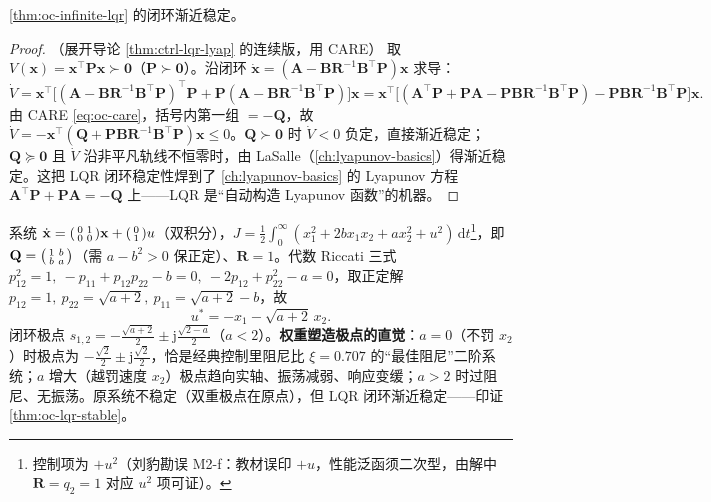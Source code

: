 \begin{theorem}\label{thm:oc-lqr-stable}
\cref{thm:oc-infinite-lqr} 的闭环渐近稳定。
\end{theorem}
\begin{proof}（展开导论 \cref{thm:ctrl-lqr-lyap} 的连续版，用 CARE）
取 $V(\mathbf x)=\mathbf x^\top\mathbf P\mathbf x\succ\mathbf0$（$\mathbf P\succ\mathbf0$）。沿闭环 $\dot{\mathbf x}=(\mathbf A-\mathbf B\mathbf R^{-1}\mathbf B^\top\mathbf P)\mathbf x$ 求导：
\[
  \dot V=\mathbf x^\top\big[(\mathbf A-\mathbf B\mathbf R^{-1}\mathbf B^\top\mathbf P)^\top\mathbf P+\mathbf P(\mathbf A-\mathbf B\mathbf R^{-1}\mathbf B^\top\mathbf P)\big]\mathbf x
  =\mathbf x^\top\big[(\mathbf A^\top\mathbf P+\mathbf P\mathbf A-\mathbf P\mathbf B\mathbf R^{-1}\mathbf B^\top\mathbf P)-\mathbf P\mathbf B\mathbf R^{-1}\mathbf B^\top\mathbf P\big]\mathbf x.
\]
由 CARE \cref{eq:oc-care}，括号内第一组 $=-\mathbf Q$，故 $\dot V=-\mathbf x^\top(\mathbf Q+\mathbf P\mathbf B\mathbf R^{-1}\mathbf B^\top\mathbf P)\mathbf x\le0$。$\mathbf Q\succ\mathbf0$ 时 $\dot V<0$ 负定，直接渐近稳定；$\mathbf Q\succeq\mathbf0$ 且 $\dot V$ 沿非平凡轨线不恒零时，由 LaSalle（\cref{ch:lyapunov-basics}）得渐近稳定。这把 LQR 闭环稳定性焊到了 \cref{ch:lyapunov-basics} 的 Lyapunov 方程 $\mathbf A^\top\mathbf P+\mathbf P\mathbf A=-\mathbf Q$ 上——LQR 是“自动构造 Lyapunov 函数”的机器。
\end{proof}

\begin{example}\label{ex:oc-lqr-second}
系统 $\dot{\mathbf x}=\begin{psmallmatrix}0&1\\0&0\end{psmallmatrix}\mathbf x+\begin{psmallmatrix}0\\1\end{psmallmatrix}u$（双积分），$J=\tfrac12\int_0^\infty(x_1^2+2bx_1x_2+ax_2^2+u^2)\,\mathrm dt$\footnote{控制项为 $+u^2$（刘豹勘误 M2-f：教材误印 $+u$，性能泛函须二次型，由解中 $\mathbf R=q_2=1$ 对应 $u^2$ 项可证）。}，即 $\mathbf Q=\begin{psmallmatrix}1&b\\b&a\end{psmallmatrix}$（需 $a-b^2>0$ 保正定）、$\mathbf R=1$。代数 Riccati 三式 $p_{12}^2=1,\ -p_{11}+p_{12}p_{22}-b=0,\ -2p_{12}+p_{22}^2-a=0$，取正定解 $p_{12}=1,\ p_{22}=\sqrt{a+2},\ p_{11}=\sqrt{a+2}-b$，故
\begin{equation}
  u^*=-x_1-\sqrt{a+2}\,x_2.
  \label{eq:oc-lqr-second-u}
\end{equation}
闭环极点 $s_{1,2}=-\tfrac{\sqrt{a+2}}{2}\pm\mathrm j\tfrac{\sqrt{2-a}}{2}$（$a<2$）。\textbf{权重塑造极点的直觉}：$a=0$（不罚 $x_2$）时极点为 $-\tfrac{\sqrt2}{2}\pm\mathrm j\tfrac{\sqrt2}{2}$，恰是经典控制里阻尼比 $\xi=0.707$ 的“最佳阻尼”二阶系统；$a$ 增大（越罚速度 $x_2$）极点趋向实轴、振荡减弱、响应变缓；$a>2$ 时过阻尼、无振荡。原系统不稳定（双重极点在原点），但 LQR 闭环渐近稳定——印证 \cref{thm:oc-lqr-stable}。
\end{example}

